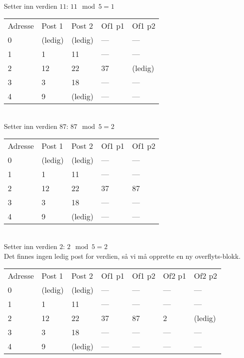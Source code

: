 \documentclass[a4paper, 12pt] {article}
\begin{document}
~\\
Setter inn verdien $11$: $11 \mod 5 = 1$\\
\begin{tabular}{|l|l|l|l|l|}
    \hline
    Adresse & Post 1 & Post 2 & Of1 p1 & Of1 p2 \\
    0       & (ledig)& (ledig)& ---   & ---   \\
    1       & 1      & 11     & ---   & ---   \\
    2       & 12     & 22     & 37     & (ledig)\\
    3       & 3      & 18     & ---   & ---   \\
    4       & 9      & (ledig)& ---   & ---   \\ \hline
\end{tabular}

~\\
Setter inn verdien $87$: $87 \mod 5 = 2$\\
\begin{tabular}{|l|l|l|l|l|}
    \hline
    Adresse & Post 1 & Post 2 & Of1 p1 & Of1 p2 \\
    0       & (ledig)& (ledig)& ---   & ---   \\
    1       & 1      & 11     & ---   & ---   \\
    2       & 12     & 22     & 37     & 87     \\
    3       & 3      & 18     & ---   & ---   \\
    4       & 9      & (ledig)& ---   & ---   \\ \hline
\end{tabular}

~\\
Setter inn verdien $2$: $2 \mod 5 = 2$\\
Det finnes ingen ledig post for verdien, så vi må opprette en ny overflyts-blokk.\\
\begin{tabular}{|l|l|l|l|l|l|l|}
    \hline
    Adresse & Post 1 & Post 2 & Of1 p1 & Of1 p2 & Of2 p1 & Of2 p2 \\
    0       & (ledig)& (ledig)& ---   & ---   & ---   & ---   \\
    1       & 1      & 11     & ---   & ---   & ---   & ---   \\
    2       & 12     & 22     & 37     & 87     & 2      & (ledig)\\
    3       & 3      & 18     & ---   & ---   & ---   & ---   \\
    4       & 9      & (ledig)& ---   & ---   & ---   & ---   \\ \hline
\end{tabular}
\end{document}
